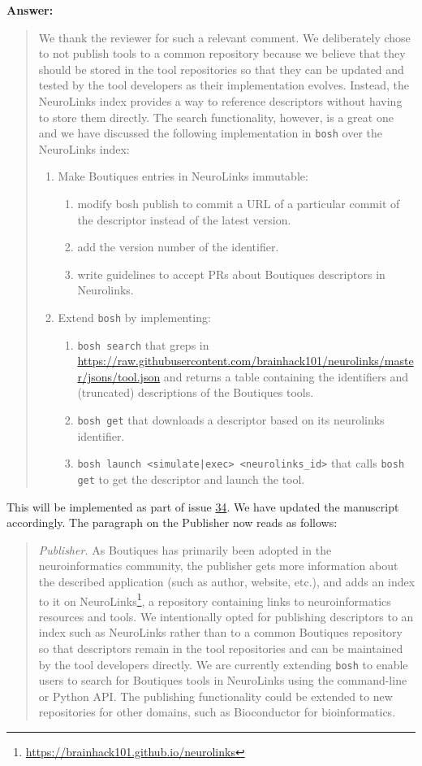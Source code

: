 \documentclass[a4]{article}
\newenvironment{answer}%
{\textbf{Answer:}\begin{quote}}%
{\end{quote}}%
\begin{document}
\begin{answer}
We thank the reviewer for such a relevant comment. We deliberately
chose to not publish tools to a common repository because we believe
that they should be stored in the tool repositories so that they can
be updated and tested by the tool developers as their implementation
evolves. Instead, the NeuroLinks index provides a way to reference
descriptors without having to store them directly. The search
functionality, however, is a great one and we have discussed the following 
implementation in \texttt{bosh} over the NeuroLinks index:
\begin{enumerate}
\item Make Boutiques entries in NeuroLinks immutable:
  \begin{enumerate}
  \item modify bosh publish to commit a URL of a particular commit of the descriptor instead of the latest version.
  \item add the version number of the identifier.
  \item write guidelines to accept PRs about Boutiques descriptors in Neurolinks.
  \end{enumerate}
\item Extend \texttt{bosh} by implementing:
  \begin{enumerate}
  \item \texttt{bosh search} that greps in \url{https://raw.githubusercontent.com/brainhack101/neurolinks/master/jsons/tool.json} and returns a table containing the identifiers and (truncated) descriptions of the Boutiques tools. 
  \item \texttt{bosh get} that downloads a descriptor based on its neurolinks identifier.
  \item \texttt{bosh launch <simulate|exec> <neurolinks\_id>}  that calls \texttt{bosh get} to get the descriptor and launch the tool.
  \end{enumerate}
\end{enumerate}
\end{answer}
This will be implemented as part of issue \href{https://github.com/boutiques/boutiques/issues/34}{34}. We have updated the manuscript accordingly. The paragraph on the Publisher now reads as follows:
\begin{quote}
\emph{Publisher.} As Boutiques has primarily been adopted in the neuroinformatics
community, the publisher gets more information about the described application (such as author,
website, etc.), and adds an index to it
on
NeuroLinks\footnote{\url{https://brainhack101.github.io/neurolinks}},
a repository containing links to neuroinformatics resources and
tools. We intentionally opted for publishing descriptors to an index
such as NeuroLinks rather than to a common Boutiques repository so
that descriptors remain in the tool repositories and can be maintained
by the tool developers directly. We are currently extending
\texttt{bosh} to enable users to search for Boutiques tools in
NeuroLinks using the command-line or Python API. The publishing
functionality could be extended to new repositories for other domains,
such as Bioconductor for
bioinformatics.
\end{quote}
\end{document}
